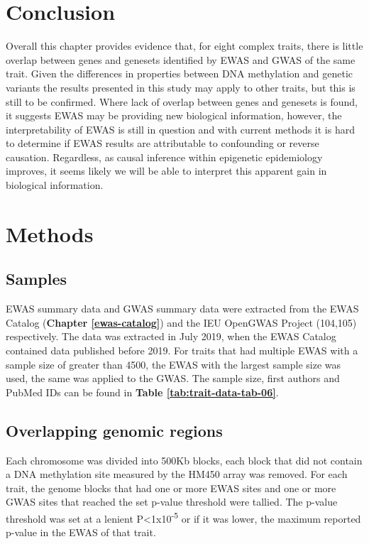 \documentclass[11pt,twoside]{bristolthesis}
\begin{document}
\hypertarget{conclusion-06}{%
\section{Conclusion}\label{conclusion-06}}

Overall this chapter provides evidence that, for eight complex traits, there is little overlap between genes and genesets identified by EWAS and GWAS of the same trait. Given the differences in properties between DNA methylation and genetic variants the results presented in this study may apply to other traits, but this is still to be confirmed. Where lack of overlap between genes and genesets is found, it suggests EWAS may be providing new biological information, however, the interpretability of EWAS is still in question and with current methods it is hard to determine if EWAS results are attributable to confounding or reverse causation. Regardless, as causal inference within epigenetic epidemiology improves, it seems likely we will be able to interpret this apparent gain in biological information.

\hypertarget{methods-06}{%
\section{Methods}\label{methods-06}}

\hypertarget{samples-06}{%
\subsection{Samples}\label{samples-06}}

EWAS summary data and GWAS summary data were extracted from the EWAS Catalog (\textbf{Chapter \ref{ewas-catalog}}) and the IEU OpenGWAS Project (104,105) respectively. The data was extracted in July 2019, when the EWAS Catalog contained data published before 2019. For traits that had multiple EWAS with a sample size of greater than 4500, the EWAS with the largest sample size was used, the same was applied to the GWAS. The sample size, first authors and PubMed IDs can be found in \textbf{Table \ref{tab:trait-data-tab-06}}.

\hypertarget{overlapping-genomic-regions}{%
\subsection{Overlapping genomic regions}\label{overlapping-genomic-regions}}

Each chromosome was divided into 500Kb blocks, each block that did not contain a DNA methylation site measured by the HM450 array was removed. For each trait, the genome blocks that had one or more EWAS sites and one or more GWAS sites that reached the set p-value threshold were tallied. The p-value threshold was set at a lenient P\textless1x10\textsuperscript{-5} or if it was lower, the maximum reported p-value in the EWAS of that trait.
\end{document}
